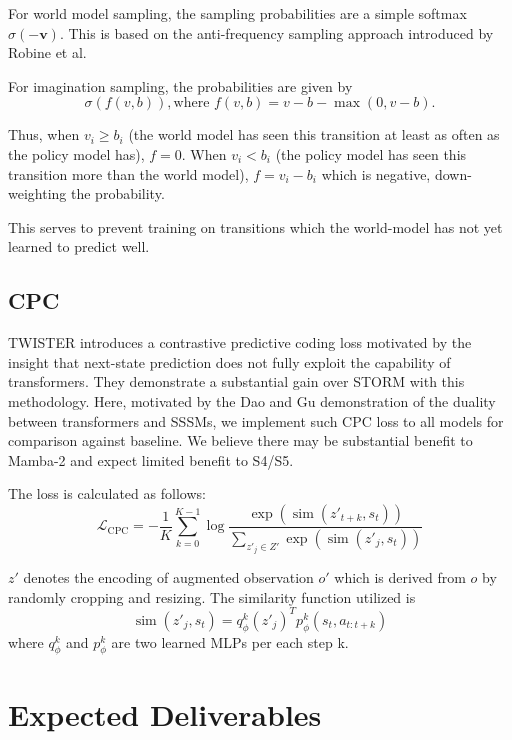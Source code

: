\documentclass{article}
\begin{document}
For world model sampling, the sampling probabilities are a simple softmax \(\sigma(-\mathbf{v})\). This is based on the anti-frequency sampling approach introduced by Robine et al.\cite{twm,drama}

For imagination sampling, the probabilities are given by
\[
\sigma(f(v, b)), \text{where } f(v, b) = v - b - \max(0, v - b).
\]

Thus, when \(v_i \ge b_i\) (the world model has seen this transition at least as often as the policy model has), \(f = 0\). When \(v_i < b_i\) (the policy model has seen this transition more than the world model), \(f = v_i - b_i\) which is negative, down-weighting the probability.

This serves to prevent training on transitions which the world-model has not yet learned to predict well.

\subsection{CPC}
TWISTER introduces a contrastive predictive coding loss motivated by the insight that next-state prediction does not fully exploit the capability of transformers\cite{twister}. They demonstrate a substantial gain over STORM with this methodology. Here, motivated by the Dao and Gu demonstration of the duality between transformers and SSSMs\cite{mamba2}, we implement such CPC loss to all models for comparison against baseline. We believe there may be substantial benefit to Mamba-2 and expect limited benefit to S4/S5.

The loss is calculated as follows:
\[
\mathcal{L}_{\mathrm{CPC}} = -\frac{1}{K}\sum_{k=0}^{K-1}\log\frac{\exp(\operatorname{sim}(z'_{t+k}, s_t))}{\sum_{z'_j\in Z'}\exp(\operatorname{sim}(z'_j, s_t))}
\]

\(z'\) denotes the encoding of augmented observation \(o'\) which is derived from \(o\) by randomly cropping and resizing.
The similarity function utilized is
\[
\operatorname{sim}(z'_j, s_t) = q^k_\phi(z'_j)^{T}p^k_\phi(s_t, a_{t:t+k})
\]
where \(q^k_\phi\) and \(p^k_\phi\) are two learned MLPs per each step k.

\section{Expected Deliverables}
\end{document}
